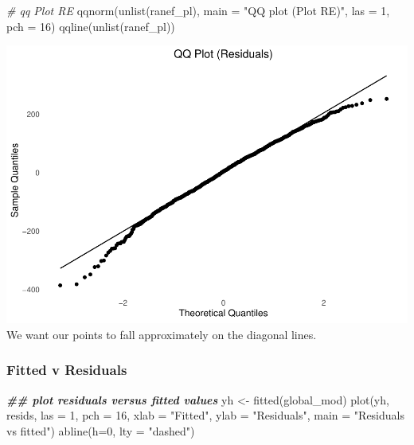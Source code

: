 \documentclass[
]{article}
\newenvironment{Shaded}{\begin{snugshade}}{\end{snugshade}}
\newcommand{\AttributeTok}[1]{\textcolor[rgb]{0.77,0.63,0.00}{#1}}
\newcommand{\CommentTok}[1]{\textcolor[rgb]{0.56,0.35,0.01}{\textit{#1}}}
\newcommand{\DecValTok}[1]{\textcolor[rgb]{0.00,0.00,0.81}{#1}}
\newcommand{\DocumentationTok}[1]{\textcolor[rgb]{0.56,0.35,0.01}{\textbf{\textit{#1}}}}
\newcommand{\FunctionTok}[1]{\textcolor[rgb]{0.00,0.00,0.00}{#1}}
\newcommand{\NormalTok}[1]{#1}
\newcommand{\OtherTok}[1]{\textcolor[rgb]{0.56,0.35,0.01}{#1}}
\newcommand{\StringTok}[1]{\textcolor[rgb]{0.31,0.60,0.02}{#1}}
\begin{document}
\begin{Shaded}
\begin{Highlighting}[]
\CommentTok{\# qq Plot RE}
\FunctionTok{qqnorm}\NormalTok{(}\FunctionTok{unlist}\NormalTok{(ranef\_pl), }\AttributeTok{main =} \StringTok{"QQ plot (Plot RE)"}\NormalTok{, }\AttributeTok{las =} \DecValTok{1}\NormalTok{, }\AttributeTok{pch =} \DecValTok{16}\NormalTok{)}
\FunctionTok{qqline}\NormalTok{(}\FunctionTok{unlist}\NormalTok{(ranef\_pl))}
\end{Highlighting}
\end{Shaded}

\includegraphics{SCMU_egg_model_files/figure-latex/d4-2.pdf} We want our
points to fall approximately on the diagonal lines.

\hypertarget{fitted-v-residuals}{%
\subsubsection{Fitted v Residuals}\label{fitted-v-residuals}}

\begin{Shaded}
\begin{Highlighting}[]
\DocumentationTok{\#\# plot residuals versus fitted values}
\NormalTok{yh }\OtherTok{\textless{}{-}} \FunctionTok{fitted}\NormalTok{(global\_mod)}
\FunctionTok{plot}\NormalTok{(yh, resids, }\AttributeTok{las =} \DecValTok{1}\NormalTok{, }\AttributeTok{pch =} \DecValTok{16}\NormalTok{,}
     \AttributeTok{xlab =} \StringTok{"Fitted"}\NormalTok{, }\AttributeTok{ylab =} \StringTok{"Residuals"}\NormalTok{,}
     \AttributeTok{main =} \StringTok{"Residuals vs fitted"}\NormalTok{)}
\FunctionTok{abline}\NormalTok{(}\AttributeTok{h=}\DecValTok{0}\NormalTok{, }\AttributeTok{lty =} \StringTok{"dashed"}\NormalTok{)}
\end{Highlighting}
\end{Shaded}
\end{document}
